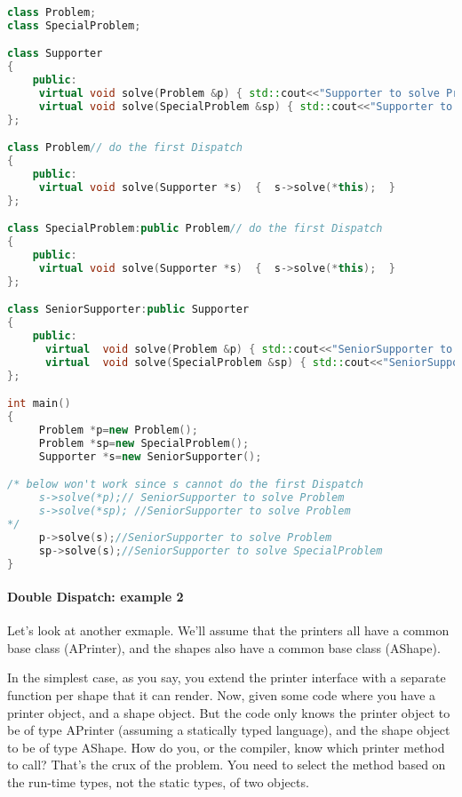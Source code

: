 \documentclass{book}
\begin{document}
\begin{lstlisting}[caption={Double Dispatch sample code 1 - similar code},label={lst:ddsc},language=C++]
class Problem;
class SpecialProblem;

class Supporter
{
    public:
     virtual void solve(Problem &p) { std::cout<<"Supporter to solve Problem"<<std::endl; }
     virtual void solve(SpecialProblem &sp) { std::cout<<"Supporter to solve SpecialProblem"<<std::endl; }
};

class Problem// do the first Dispatch
{
    public:
     virtual void solve(Supporter *s)  {  s->solve(*this);  }   
};

class SpecialProblem:public Problem// do the first Dispatch
{
    public:
     virtual void solve(Supporter *s)  {  s->solve(*this);  }   
};

class SeniorSupporter:public Supporter
{
    public:
      virtual  void solve(Problem &p) { std::cout<<"SeniorSupporter to solve Problem"<<std::endl; }
      virtual  void solve(SpecialProblem &sp) { std::cout<<"SeniorSupporter to solve SpecialProblem"<<std::endl; }
};

int main()
{
     Problem *p=new Problem();
     Problem *sp=new SpecialProblem();
     Supporter *s=new SeniorSupporter();

/* below won't work since s cannot do the first Dispatch 
     s->solve(*p);// SeniorSupporter to solve Problem
     s->solve(*sp); //SeniorSupporter to solve Problem
*/
     p->solve(s);//SeniorSupporter to solve Problem
     sp->solve(s);//SeniorSupporter to solve SpecialProblem
}
\end{lstlisting}
\paragraph{Double Dispatch: example 2}
Let's look at another exmaple.
We'll assume that the printers all have a common base class (APrinter), and the shapes also have a common base class (AShape).

In the simplest case, as you say, you extend the printer interface with a separate function per shape that it can render.
Now, given some code where you have a printer object, and a shape object.
But the code only knows the printer object to be of type APrinter (assuming a statically typed language), and the shape object to be of type AShape.
How do you, or the compiler, know which printer method to call? That's the crux of the problem.
You need to select the method based on the run-time types, not the static types, of two objects. 
\end{document}
